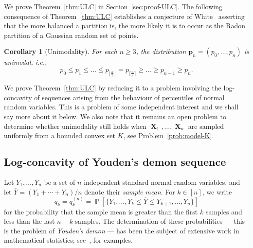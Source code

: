 \documentclass[12pt,english,reqno]{amsart}
\theoremstyle{plain}
\newtheorem{cor}[thm]{Corollary}
\theoremstyle{remark}
\numberwithin{figure}{section}
\numberwithin{equation}{section}
\def\bY{\overline{Y}}
\DeclareMathOperator{\Pb}{\mathbb{P}} %
\DeclareMathOperator{\Xb}{\mathbf{X}} %
\newcommand{\com}[2]{\textcolor{blue}{\texttt{#1 comment: #2}}}
\def\ap{p} %
\def\aq{q} %
\newcommand{\darkblue}{\color{darkblue}}
\newcommand{\defnb}[1]{\emph{\darkblue #1}}
\begin{document}
We prove Theorem~\ref{thm:ULC} in Section~\ref{sec:proof-ULC}.
The following consequence of Theorem~\ref{thm:ULC} establishes a conjecture of White~\citep{White} asserting that the more balanced a partition is, the more likely it is to occur as the Radon partition of a Gaussian random set of points.

\begin{cor}[Unimodality]\label{cor:unimodality}
	For each $n \geq 3$, the distribution $\mathbf{p}_n = (p_0,\dots, p_n)$ is unimodal, i.e.,
	\[
		\ap_0 \leq \ap_1 \leq \dots \leq \ap_{\lfloor \frac{n}{2}\rfloor} = \ap_{\lceil \frac{n}{2}\rceil} \geq \dots \geq \ap_{n-1} \geq \ap_{n}. \]
\end{cor}

We prove Theorem~\ref{thm:ULC} by reducing it to a problem involving the log-concavity of sequences arising from the behaviour of percentiles of normal random variables. This is a problem of some independent interest and we shall say more about it below.
We  also note that it remains an open problem to determine whether unimodality still holds when $\Xb_1,\ldots,\Xb_n$ are sampled uniformly from a bounded convex set $K$, see  Problem~\ref{prob:model-K}.











\subsection*{{Log-concavity of Youden's demon sequence}}
Let $Y_1,\dots, Y_n$ be a set of $n$ independent standard normal random variables, and let $\bY = ({Y_1+\cdots+Y_n})/{n}$ denote their \defnb{sample mean}. For $k \in [n]$, we write
\begin{equation}\label{eq:q_k}
	\aq_k = \aq_k^{(n)} = \Pb \left [ \{Y_1,\dots, Y_k \leq \bY \leq Y_{k+1}, \dots, Y_{n} \}\right]
\end{equation}
for the probability that the sample mean is greater than the first $k$ samples and less than the last $n-k$ samples. The determination of these probabilities --- this is the problem of \defnb{Youden's demon} --- has been the subject of extensive work in mathematical statistics; see~\citep{You53,Ken,DmiGov97,FNP25}, for examples.
\end{document}
